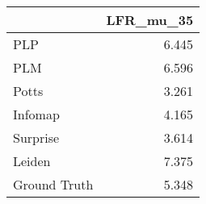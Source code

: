 \begin{tabular}{lr}
\toprule
{} & LFR_mu_35 \\
\midrule
PLP          &     6.445 \\
PLM          &     6.596 \\
Potts        &     3.261 \\
Infomap      &     4.165 \\
Surprise     &     3.614 \\
Leiden       &     7.375 \\
Ground Truth &     5.348 \\
\bottomrule
\end{tabular}
